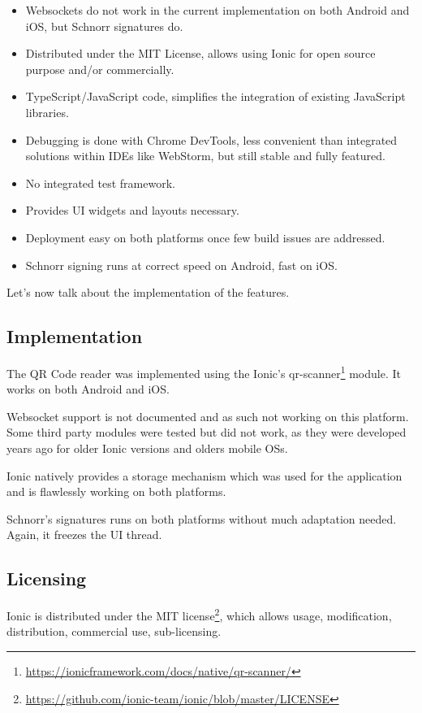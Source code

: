 \documentclass[11pt, a4paper, twoside, openright]{article} %
\begin{document}
{\begin{itemize}
	\item Websockets do not work in the current implementation on both Android and iOS, but Schnorr signatures do.
	\item Distributed under the MIT License, allows using Ionic for open source purpose and/or commercially.
	\item TypeScript/JavaScript code, simplifies the integration of existing JavaScript libraries.
	\item Debugging is done with Chrome DevTools, less convenient than integrated solutions within IDEs like WebStorm, but still stable and fully featured.
	\item No integrated test framework.
	\item Provides UI widgets and layouts necessary.
	\item Deployment easy on both platforms once few build issues are addressed.
	\item Schnorr signing runs at correct speed on Android,  fast on iOS.
\end{itemize}

Let's now talk about the implementation of the features.

\subsection{Implementation}
The QR Code reader was implemented using the Ionic's qr-scanner\footnote{\url{https://ionicframework.com/docs/native/qr-scanner/}} module. It works on both Android and iOS.


Websocket support is not documented and as such not working on this platform. Some third party modules were tested but did not work, as they were developed years ago for older Ionic versions and olders mobile OSs.

Ionic natively provides a storage mechanism which was used for the application and is flawlessly working on both platforms.

Schnorr's signatures runs on both platforms without much adaptation needed. Again, it freezes the UI thread.

\subsection{Licensing}
Ionic is distributed under the MIT license\footnote{\url{https://github.com/ionic-team/ionic/blob/master/LICENSE}}, which allows usage, modification, distribution, commercial use, sub-licensing.\\

}
\end{document}
